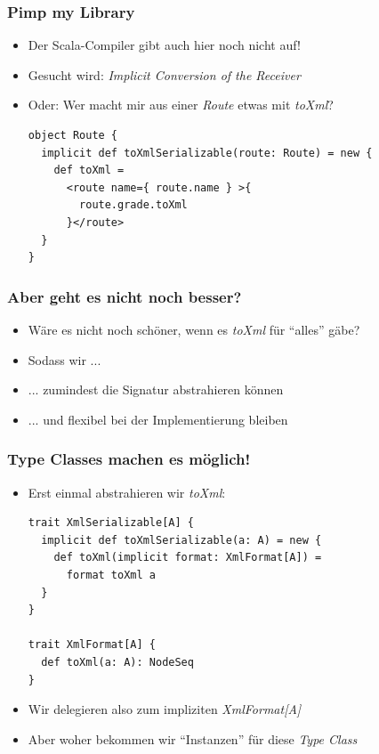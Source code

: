 \documentclass{beamer}
\begin{document}
\begin{frame}[fragile]
  \frametitle{Pimp my Library}
  \begin{itemize}
    \item Der Scala-Compiler gibt auch hier noch nicht auf!
    \item Gesucht wird: \emph{Implicit Conversion of the Receiver}
    \item Oder: Wer macht mir aus einer \emph{Route} etwas mit \emph{toXml}?
    \begin{lstlisting}
object Route {
  implicit def toXmlSerializable(route: Route) = new {
    def toXml =
      <route name={ route.name } >{ 
        route.grade.toXml
      }</route>
  }
}
    \end{lstlisting}
  \end{itemize}
\end{frame}

\begin{frame}[fragile]
  \frametitle{Aber geht es nicht noch besser?}
  \begin{itemize}
    \item W\"are es nicht noch sch\"oner, wenn es \emph{toXml} f\"ur "`alles"' g\"abe?
    \item Sodass wir ... 
    \item ... zumindest die Signatur abstrahieren k\"onnen
    \item ... und flexibel bei der Implementierung bleiben
  \end{itemize}
\end{frame}

\begin{frame}[fragile]
  \frametitle{Type Classes machen es m\"oglich!}
  \begin{itemize}
    \item Erst einmal abstrahieren wir \emph{toXml}:
    \begin{lstlisting}
trait XmlSerializable[A] {
  implicit def toXmlSerializable(a: A) = new {
    def toXml(implicit format: XmlFormat[A]) =
      format toXml a
  }
}

trait XmlFormat[A] {
  def toXml(a: A): NodeSeq
}
    \end{lstlisting}
    \item Wir delegieren also zum impliziten \emph{XmlFormat[A]}
    \item Aber woher bekommen wir "`Instanzen"' f\"ur diese \emph{Type Class}
  \end{itemize}
\end{frame}
\end{document}
